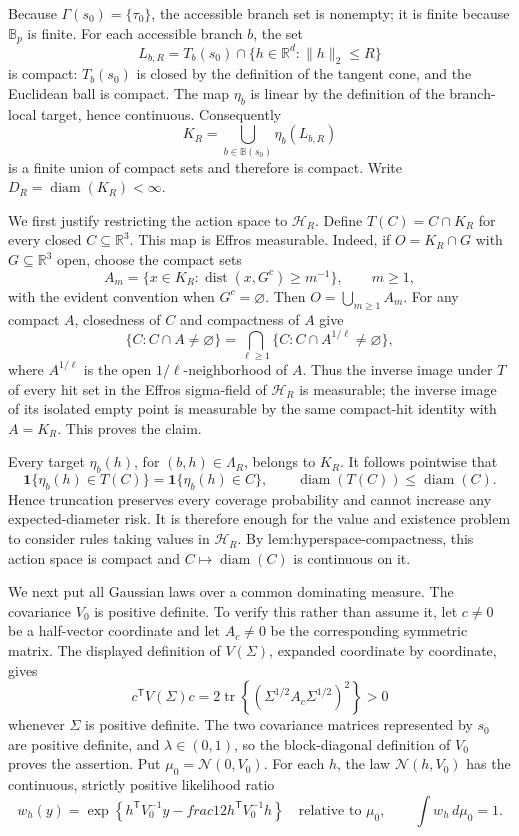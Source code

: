 Because \(\Gamma(s_0)=\{\tau_0\}\), the accessible branch set is nonempty; it is finite because \(\mathbb B_p\) is finite.  For each accessible branch \(b\), the set
\[
L_{b,R}=T_b(s_0)\cap\{h\in\mathbb R^d:\|h\|_2\le R\}
\]
is compact: \(T_b(s_0)\) is closed by the definition of the tangent cone, and the Euclidean ball is compact.  The map \(\eta_b\) is linear by the definition of the branch-local target, hence continuous.  Consequently
\[
K_R=\bigcup_{b\in\mathbb B(s_0)}\eta_b(L_{b,R})
\]
is a finite union of compact sets and therefore is compact.  Write \(D_R=\operatorname{diam}(K_R)<\infty\).

We first justify restricting the action space to \(\mathcal H_R\).  Define \(T(C)=C\cap K_R\) for every closed \(C\subseteq\mathbb R^3\).  This map is Effros measurable.  Indeed, if \(O=K_R\cap G\) with \(G\subseteq\mathbb R^3\) open, choose the compact sets
\[
A_m=\{x\in K_R:\operatorname{dist}(x,G^c)\ge m^{-1}\},\qquad m\ge1,
\]
with the evident convention when \(G^c=\varnothing\).  Then \(O=\bigcup_{m\ge1}A_m\).  For any compact \(A\), closedness of \(C\) and compactness of \(A\) give
\[
\{C:C\cap A\ne\varnothing\}
=\bigcap_{\ell\ge1}\{C:C\cap A^{1/\ell}\ne\varnothing\},
\]
where \(A^{1/\ell}\) is the open \(1/\ell\)-neighborhood of \(A\).  Thus the inverse image under \(T\) of every hit set in the Effros sigma-field of \(\mathcal H_R\) is measurable; the inverse image of its isolated empty point is measurable by the same compact-hit identity with \(A=K_R\).  This proves the claim.

Every target \(\eta_b(h)\), for \((b,h)\in\Lambda_R\), belongs to \(K_R\).  It follows pointwise that
\[
\mathbf 1\{\eta_b(h)\in T(C)\}=\mathbf 1\{\eta_b(h)\in C\},
\qquad
\operatorname{diam}(T(C))\le\operatorname{diam}(C).
\]
Hence truncation preserves every coverage probability and cannot increase any expected-diameter risk.  It is therefore enough for the value and existence problem to consider rules taking values in \(\mathcal H_R\).  By \(\text{lem:hyperspace-compactness}\), this action space is compact and \(C\mapsto\operatorname{diam}(C)\) is continuous on it.

We next put all Gaussian laws over a common dominating measure.  The covariance \(V_0\) is positive definite.  To verify this rather than assume it, let \(c\ne0\) be a half-vector coordinate and let \(A_c\ne0\) be the corresponding symmetric matrix.  The displayed definition of \(V(\Sigma)\), expanded coordinate by coordinate, gives
\[
c^{\mathsf T}V(\Sigma)c
=2\operatorname{tr}\!\left\{(\Sigma^{1/2}A_c\Sigma^{1/2})^2\right\}>0
\]
whenever \(\Sigma\) is positive definite.  The two covariance matrices represented by \(s_0\) are positive definite, and \(\lambda\in(0,1)\), so the block-diagonal definition of \(V_0\) proves the assertion.  Put \(\mu_0=\mathcal N(0,V_0)\).  For each \(h\), the law \(\mathcal N(h,V_0)\) has the continuous, strictly positive likelihood ratio
\[
w_h(y)=\exp\!\left\{h^{\mathsf T}V_0^{-1}y-  frac12h^{\mathsf T}V_0^{-1}h\right\}
\quad\text{relative to }\mu_0,
\qquad
\int w_h\,d\mu_0=1.
\]

